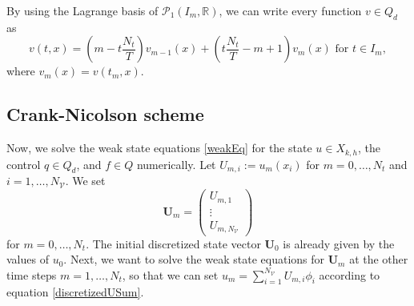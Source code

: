 By using the Lagrange basis of $\mathcal{P}_1(I_m,\mathbb{R})$, we can write every function $v \in Q_d$ as
\begin{equation}
\label{discretizeVariableInTime}
v(t,x)=\left(m-t\frac{N_t}{T}\right) v_{m-1}(x)+\left(t\frac{N_t}{T}-m+1\right) v_m(x)\text{ for }t\in I_m,
\end{equation}
where $v_m(x)=v(t_m,x)$.


\subsection{Crank-Nicolson scheme}
Now, we solve the weak state equations \eqref{weakEq} for the state $u\in X_{k,h}$, the control $q\in Q_d$, and $f\in Q$ numerically. Let $U_{m,i}:=u_m(x_i)$ for $m=0,\dotsc,N_t$ and $i=1,\dotsc,N_\mathcal{V}$. We set
\begin{displaymath}
\mathbf{U}_m=\begin{pmatrix} U_{m,1} \\ \vdots \\ U_{m,N_\mathcal{V}} \end{pmatrix}
\end{displaymath}
for $m=0,\dotsc,N_t$. The initial discretized state vector $\mathbf{U}_0$ is already given by the values of $u_0$. Next, we want to solve the weak state equations for $\mathbf{U}_m$ at the other time steps $m=1,\dotsc,N_t$, so that we can set $u_m=\sum_{i=1}^{N_\mathcal{V}}U_{m,i}\phi_i$ according to equation \eqref{discretizedUSum}.

